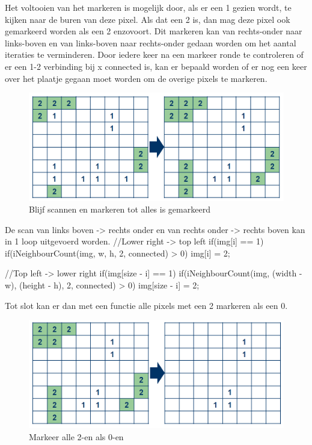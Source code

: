 Het voltooien van het markeren is mogelijk door, als er een 1 gezien wordt, 
te kijken naar de buren van deze pixel. Als dat een 2 is, dan mag deze pixel 
ook gemarkeerd worden als een 2 enzovoort. Dit markeren kan van rechts-onder 
naar links-boven en van links-boven naar rechts-onder gedaan worden om het 
aantal iteraties te verminderen. Door iedere keer na een markeer ronde te 
controleren of er een 1-2 verbinding bij x connected is, kan er bepaald worden 
of er nog een keer over het plaatje gegaan moet worden om de overige pixels te 
markeren.

\begin{figure}
    \begin{center}
        \includegraphics[scale=0.5]{figures/border_blob_step2.png}
    \end{center}
    \caption{Blijf scannen en markeren tot alles is gemarkeerd}
    \label{fig:bbstep2}
\end{figure}

De scan van links boven -> rechts onder en van rechts onder -> rechts boven 
kan in 1 loop uitgevoerd worden.
//Lower right -> top left
if(img[i] == 1){
    if(iNeighbourCount(img, w, h, 2, connected) > 0){
        img[i] = 2;
    }
}

//Top left -> lower right
if(img[size - i] == 1){
    if(iNeighbourCount(img, (width - w), (height - h), 2, connected) > 0){
        img[size - i] = 2;
    }
}

Tot slot kan er dan met een functie alle pixels met een 2 markeren als een 0.

\begin{figure}
    \begin{center}
        \includegraphics[scale=0.5]{figures/border_blob_step3.png}
    \end{center}
    \caption{Markeer alle 2-en als 0-en}
    \label{fig:bbstep3}
\end{figure}

